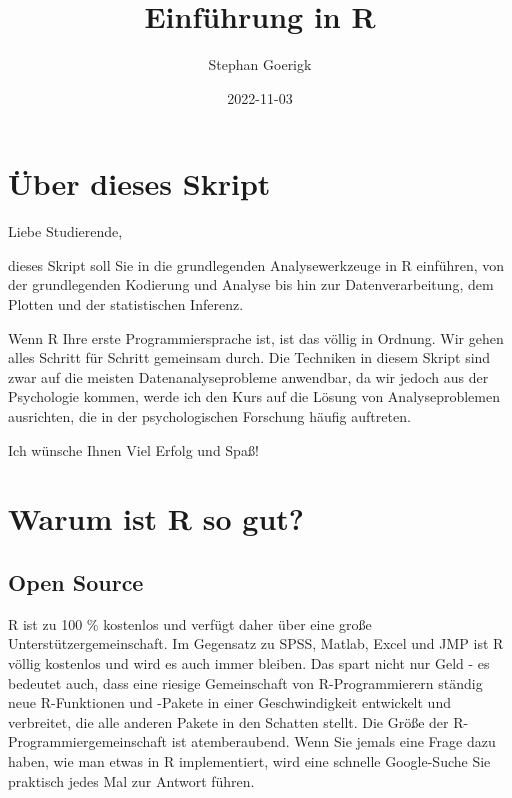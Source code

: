 \documentclass[
]{book}
\title{Einführung in R}
\author{Stephan Goerigk}
\date{2022-11-03}
\begin{document}
\maketitle

{
\setcounter{tocdepth}{1}
\tableofcontents
}
\hypertarget{uxfcber-dieses-skript}{%
\chapter*{Über dieses Skript}\label{uxfcber-dieses-skript}}

Liebe Studierende,

dieses Skript soll Sie in die grundlegenden Analysewerkzeuge in R einführen, von der grundlegenden Kodierung und Analyse bis hin zur Datenverarbeitung, dem Plotten und der statistischen Inferenz.

Wenn R Ihre erste Programmiersprache ist, ist das völlig in Ordnung. Wir gehen alles Schritt für Schritt gemeinsam durch. Die Techniken in diesem Skript sind zwar auf die meisten Datenanalyseprobleme anwendbar, da wir jedoch aus der Psychologie kommen, werde ich den Kurs auf die Lösung von Analyseproblemen ausrichten, die in der psychologischen Forschung häufig auftreten.

Ich wünsche Ihnen Viel Erfolg und Spaß!

\hypertarget{warum-ist-r-so-gut}{%
\chapter{Warum ist R so gut?}\label{warum-ist-r-so-gut}}

\hypertarget{open-source}{%
\section{Open Source}\label{open-source}}

R ist zu 100 \% kostenlos und verfügt daher über eine große Unterstützergemeinschaft. Im Gegensatz zu SPSS, Matlab, Excel und JMP ist R völlig kostenlos und wird es auch immer bleiben. Das spart nicht nur Geld - es bedeutet auch, dass eine riesige Gemeinschaft von R-Programmierern ständig neue R-Funktionen und -Pakete in einer Geschwindigkeit entwickelt und verbreitet, die alle anderen Pakete in den Schatten stellt. Die Größe der R-Programmiergemeinschaft ist atemberaubend. Wenn Sie jemals eine Frage dazu haben, wie man etwas in R implementiert, wird eine schnelle Google-Suche Sie praktisch jedes Mal zur Antwort führen.
\end{document}

